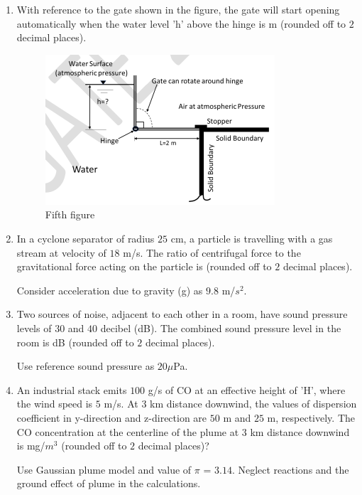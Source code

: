 \documentclass[journal]{IEEEtran}
\numberwithin{equation}{enumi}
\numberwithin{figure}{enumi}
\begin{document}
\begin{enumerate}[start=1, label={Q\arabic*.}]
\item With reference to the gate shown in the figure, the gate will start opening automatically
when the water level 'h' above the hinge is \underline{\hspace{1.5cm}}m
(rounded off to $2$ decimal places).
\begin{figure}[H]
    \centering
    \includegraphics[width=0.4\linewidth]{figs/fig5.png}
    \caption{Fifth figure}
    \label{fig:fifth}
\end{figure}
\newpage
\item In a cyclone separator of radius $25$ cm, a particle is travelling with a gas stream at velocity
of $18$ m/s. The ratio of centrifugal force to the gravitational force acting on the particle is
\underline{\hspace{1.5cm}} (rounded off to $2$ decimal places).

Consider acceleration due to gravity (g) as $9.8$ m/$s^2$.

\vspace{0.2cm}
\item Two sources of noise, adjacent to each other in a room, have sound pressure levels of $30$
and $40$ decibel (dB). The combined sound pressure level in the room is \underline{\hspace{1.5cm}} dB
(rounded off to $2$ decimal places).

\vspace{0.1cm}
Use reference sound pressure as $20\mu$Pa.

\vspace{0.3cm}
\item An industrial stack emits $100$ g/s of CO at an effective height of 'H', where the wind
speed is $5$ m/s. At $3$ km distance downwind, the values of dispersion coefficient in y-direction and z-direction are $50$ m and $25$ m, respectively. The CO concentration at the
centerline of the plume at $3$ km distance downwind is \underline{\hspace{1.5cm}}mg/$m^3$
(rounded off to $2$
decimal places)?

\vspace{0.1cm}
Use Gaussian plume model and value of $\pi$ = $3.14$. Neglect reactions and the ground effect
of plume in the calculations.


\end{enumerate}
\end{document}
